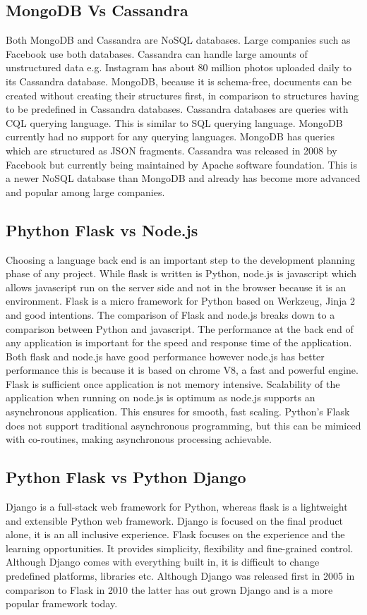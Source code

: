 \subsection{MongoDB Vs Cassandra}
Both MongoDB and Cassandra are NoSQL databases. Large companies such as Facebook use both databases. Cassandra can handle large amounts of unstructured data e.g. Instagram has about 80 million photos uploaded daily to its Cassandra database. MongoDB, because it is schema-free, documents can be created without creating their structures first, in comparison to structures having to be predefined in Cassandra databases. Cassandra databases are queries with CQL querying language. This is similar to SQL querying language.\cite{cassandra_vs_mongodb_2016} MongoDB currently had no support for any querying languages. MongoDB has queries which are structured as JSON fragments. Cassandra was released in 2008 by Facebook but currently being maintained by Apache software foundation. This is a newer NoSQL database than MongoDB and already has become more advanced and popular among large companies.\cite{sarig_2019}

\subsection{Phython Flask vs Node.js}
Choosing a language back end is an important step to the development planning phase of any project. While flask is written is Python, node.js is javascript which allows javascript run on the server side and not in the browser because it is an environment. Flask is a micro framework for Python based on Werkzeug, Jinja 2 and good intentions.\cite{flask_2019} The comparison of Flask and node.js breaks down to a comparison between Python and javascript. The performance at the back end of any application is important for the speed and response time of the application. Both flask and node.js have good performance however node.js has better performance this is because it is based on chrome V8, a fast and powerful engine. \cite{nodeFlaskcomparison_2019} Flask is sufficient once application is not memory intensive. Scalability of the application when running on node.js is optimum as node.js supports an asynchronous application. This ensures for smooth, fast scaling. Python's Flask does not support traditional asynchronous programming, but this can be mimiced with co-routines, making asynchronous processing achievable.\cite{python_vs_node}

\subsection{Python Flask vs Python Django}
Django is a full-stack web framework for Python, whereas flask is a lightweight and extensible Python web framework. Django is focused on the final product alone, it is an all inclusive experience. Flask focuses on the experience and the learning opportunities. It provides simplicity, flexibility and fine-grained control. Although Django comes with everything built in, it is difficult to change predefined platforms, libraries etc. Although Django was released first in 2005 in comparison to Flask in 2010 the latter has out grown Django and is a more popular framework today.\cite{codementor_2019}

